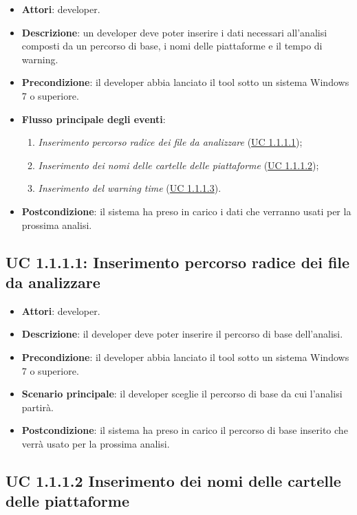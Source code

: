 		\begin{itemize}
			\item\textbf{Attori}: developer.
			\item\textbf{Descrizione}: un developer deve poter inserire i dati necessari all'analisi composti da un percorso di base, i nomi delle piattaforme e il tempo di warning.
			\item\textbf{Precondizione}: il developer abbia lanciato il tool sotto un sistema Windows 7 o superiore.
			\item\textbf{Flusso principale degli eventi}: 
			\begin{enumerate}
				\item\textit{Inserimento percorso radice dei file da analizzare} (\hyperref[subsec:UC1.1.1.1]{UC 1.1.1.1});
				\item\textit{Inserimento dei nomi delle cartelle delle piattaforme} (\hyperref[subsec:UC1.1.1.2]{UC 1.1.1.2});
				\item\textit{Inserimento del warning time} (\hyperref[subsec:UC1.1.1.3]{UC 1.1.1.3}).
			\end{enumerate}
			\item\textbf{Postcondizione}: il sistema ha preso in carico i dati che verranno usati per la prossima analisi.
		\end{itemize}
		
	\subsection{UC 1.1.1.1: Inserimento percorso radice dei file da analizzare}
		\label{subsec:UC1.1.1.1}
		
		\begin{itemize}
			\item\textbf{Attori}: developer.
			\item\textbf{Descrizione}: il developer deve poter inserire il percorso di base dell'analisi.
			\item\textbf{Precondizione}: il developer abbia lanciato il tool sotto un sistema Windows 7 o superiore.
			\item\textbf{Scenario principale}: il developer sceglie il percorso di base da cui l'analisi partirà.
			\item\textbf{Postcondizione}: il sistema ha preso in carico il percorso di base inserito che verrà usato per la prossima analisi.
		\end{itemize}

	\subsection{UC 1.1.1.2 Inserimento dei nomi delle cartelle delle piattaforme}
		\label{subsec:UC1.1.1.2}
	

